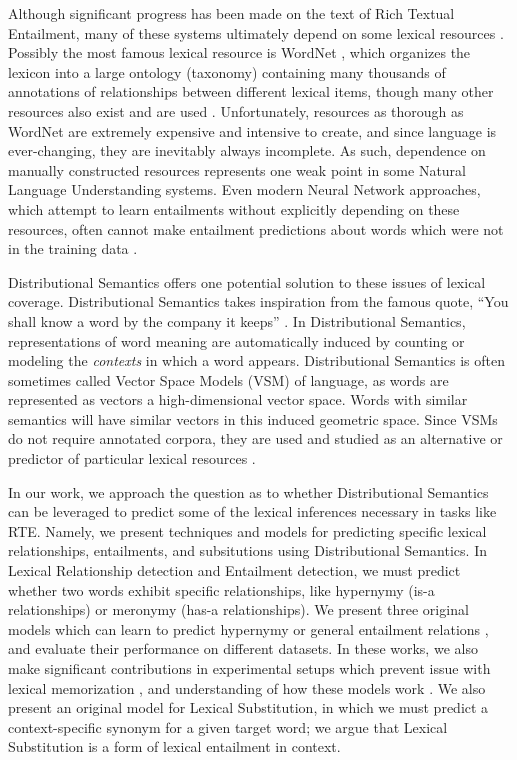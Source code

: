 \documentclass[12pt]{article}
\begin{document}
Although significant progress has been made on the text of Rich Textual
Entailment, many of these systems ultimately depend on some lexical resources
\cite{beltagy:2014:semeval,bjerva:2014:semeval,lai:2014:semeval,marelli:2014:semeval,beltagy:2016:cl}.
Possibly the most famous lexical resource is WordNet \cite{miller:1995:acm},
which organizes the lexicon into a large ontology (taxonomy) containing many
thousands of annotations of relationships between different lexical items,
though many other resources also exist and are used
\cite{baker:1998:acl,baroni:2011:gems,baroni:2012:eacl,ganitkevitch:2013:naacl,jurgens:2012:semeval,levy:2014:conll,turney:2015:nle}.
Unfortunately, resources as thorough as WordNet are extremely expensive and
intensive to create, and since language is ever-changing, they are inevitably
always incomplete. As such, dependence on manually constructed resources
represents one weak point in some Natural Language Understanding systems. Even
modern Neural Network approaches, which attempt to learn entailments without
explicitly depending on these resources, often cannot make entailment
predictions about words which were not in the training data
\cite{bowman:2015:emnlp,cheng:2016:arxiv}.

Distributional Semantics offers one potential solution to these issues of lexical
coverage. Distributional Semantics takes inspiration from the famous quote,
``You shall know a word by the company it keeps'' \cite{firth:1957:la}. In
Distributional Semantics, representations of word meaning are automatically
induced by counting or modeling the {\em contexts} in which a word appears.
Distributional Semantics is often sometimes called Vector Space Models (VSM) of
language, as words are represented as vectors a high-dimensional vector space.
Words with similar semantics will have similar vectors in this induced
geometric space. Since VSMs do not require annotated corpora, they are used and
studied as an alternative or predictor of particular lexical resources
\cite{snow:2004:nips,baroni:2011:gems}.

In our work, we approach the question as to whether Distributional Semantics
can be leveraged to predict some of the lexical inferences necessary in tasks
like RTE. Namely, we present techniques and models for predicting specific
lexical relationships, entailments, and subsitutions using Distributional
Semantics. In Lexical Relationship detection and Entailment detection, we must
predict whether two words exhibit specific relationships, like hypernymy (is-a
relationships) or meronymy (has-a relationships). We present three original
models which can learn to predict hypernymy or general entailment relations
\cite{roller:2014:coling,beltagy:2016:cl,roller:2016:emnlp}, and evaluate their
performance on different datasets. In these works, we also make significant
contributions in experimental setups which prevent issue with lexical
memorization \cite{roller:2014:coling}, and understanding of how these models
work \cite{roller:2016:emnlp}.  We also present an original model for Lexical
Substitution, in which we must predict a context-specific synonym for a given
target word; we argue that Lexical Substitution is a form of lexical entailment
in context.
\end{document}
